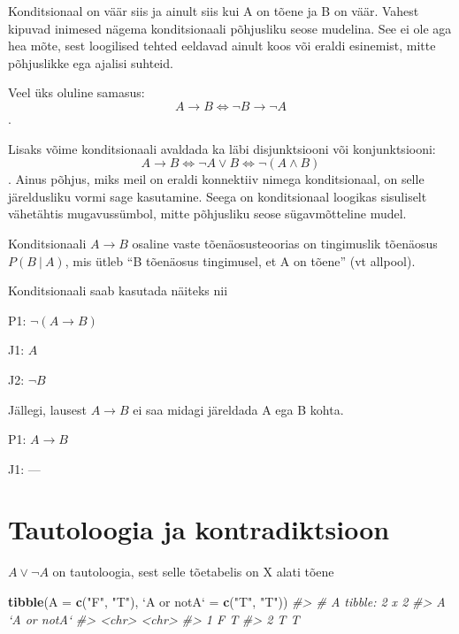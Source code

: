 \documentclass[]{book}
\newenvironment{Shaded}{\begin{snugshade}}{\end{snugshade}}
\newcommand{\KeywordTok}[1]{\textcolor[rgb]{0.13,0.29,0.53}{\textbf{#1}}}
\newcommand{\DataTypeTok}[1]{\textcolor[rgb]{0.13,0.29,0.53}{#1}}
\newcommand{\StringTok}[1]{\textcolor[rgb]{0.31,0.60,0.02}{#1}}
\newcommand{\CommentTok}[1]{\textcolor[rgb]{0.56,0.35,0.01}{\textit{#1}}}
\newcommand{\NormalTok}[1]{#1}
\begin{document}
Konditsionaal on väär siis ja ainult siis kui A on tõene ja B on väär.
Vahest kipuvad inimesed nägema konditsionaali põhjusliku seose mudelina.
See ei ole aga hea mõte, sest loogilised tehted eeldavad ainult koos või
eraldi esinemist, mitte põhjuslikke ega ajalisi suhteid.

Veel üks oluline samasus:
\[A \rightarrow B \Leftrightarrow \neg B \rightarrow \neg A\].

Lisaks võime konditsionaali avaldada ka läbi disjunktsiooni või
konjunktsiooni:
\[A \rightarrow B \Leftrightarrow \neg A \lor B \Leftrightarrow \neg(A \land B)\].
Ainus põhjus, miks meil on eraldi konnektiiv nimega konditsionaal, on
selle järeldusliku vormi sage kasutamine. Seega on konditsionaal
loogikas sisuliselt vähetähtis mugavussümbol, mitte põhjusliku seose
sügavmõtteline mudel.

Konditsionaali \(A \rightarrow B\) osaline vaste tõenäosusteoorias on
tingimuslik tõenäosus \(P(B ~\vert~ A)\), mis ütleb ``B tõenäosus
tingimusel, et A on tõene'' (vt allpool).

Konditsionaali saab kasutada näiteks nii

P1: \(\neg (A \rightarrow B)\)

J1: \(A\)

J2: \(\neg B\)

Jällegi, lausest \(A \rightarrow B\) ei saa midagi järeldada A ega B
kohta.

P1: \(A \rightarrow B\)

J1: ---

\section{Tautoloogia ja
kontradiktsioon}\label{tautoloogia-ja-kontradiktsioon}

\(A \lor \neg A\) on tautoloogia, sest selle tõetabelis on X alati tõene

\begin{Shaded}
\begin{Highlighting}[]
\KeywordTok{tibble}\NormalTok{(}\DataTypeTok{A =} \KeywordTok{c}\NormalTok{(}\StringTok{"F"}\NormalTok{, }\StringTok{"T"}\NormalTok{), }\StringTok{`}\DataTypeTok{A or notA}\StringTok{`}\NormalTok{ =}\StringTok{ }\KeywordTok{c}\NormalTok{(}\StringTok{"T"}\NormalTok{, }\StringTok{"T"}\NormalTok{))}
\CommentTok{#> # A tibble: 2 x 2}
\CommentTok{#>   A     `A or notA`}
\CommentTok{#>   <chr> <chr>      }
\CommentTok{#> 1 F     T          }
\CommentTok{#> 2 T     T}
\end{Highlighting}
\end{Shaded}
\end{document}
